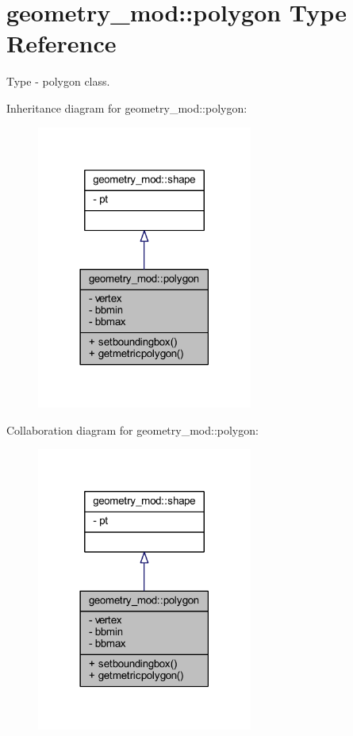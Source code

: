 \hypertarget{structgeometry__mod_1_1polygon}{}\section{geometry\+\_\+mod\+:\+:polygon Type Reference}
\label{structgeometry__mod_1_1polygon}


Type -\/ polygon class.  




Inheritance diagram for geometry\+\_\+mod\+:\+:polygon\+:\nopagebreak
\begin{figure}[H]
\begin{center}
\leavevmode
\includegraphics[width=201pt]{structgeometry__mod_1_1polygon__inherit__graph}
\end{center}
\end{figure}


Collaboration diagram for geometry\+\_\+mod\+:\+:polygon\+:\nopagebreak
\begin{figure}[H]
\begin{center}
\leavevmode
\includegraphics[width=201pt]{structgeometry__mod_1_1polygon__coll__graph}
\end{center}
\end{figure}
